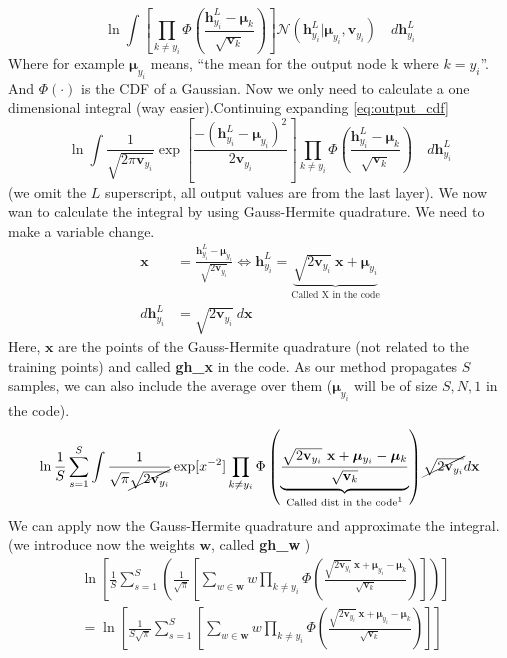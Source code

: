 \documentclass[]{article}
\newcommand{\mbf}[1]{\ensuremath{\mathbf{#1}}}
\begin{document}
\begin{equation}
\label{eq:output_cdf}
\ln \int \left[ \prod_{k\neq y_i} \Phi \left( \frac{\mbf{h}_{y_i}^L - \bm \mu_k}{\sqrt{\mbf{v}_k}} \right) \right] \mathcal{N}(\mbf{h}_{y_i}^L | \bm \mu_{y_i}, \mbf{v}_{y_i} ) \quad d\mbf{h}^L_{y_i}
\end{equation}
Where for example $\bm \mu_{y_i} $ means, ``the mean for the output node k where $k=y_i$''. And $\Phi(\cdot)$ is the CDF of a Gaussian. Now we only need to calculate a one dimensional integral (way easier).Continuing expanding \ref{eq:output_cdf}
\begin{equation}
\ln \int \frac{1}{\sqrt{2 \pi \mbf{v}_{y_i}}} \exp\left[ \frac{-(\mbf{h}_{y_i}^L - \bm \mu_{y_i})^2}{2 \mbf{v}_{y_i} } \right] \prod_{k\neq y_i} \Phi \left( \frac{\mbf{h}_{y_i}^L - \bm \mu_k}{\sqrt{\mbf{v}_k}} \right) \quad d\mbf{h}^L_{y_i}
\end{equation}
(we omit the $L$ superscript, all output values are from the last layer).
We now wan to calculate the integral by using Gauss-Hermite quadrature. We need to make a variable change.
\begin{align}
\mbf{x} &= \frac{\mbf{h}_{y_i}^L - \bm \mu_{y_i}}{\sqrt{2\mbf{v}_{y_i}}} \iff \mbf{h}_{y_i}^L = \underbrace{\sqrt{2\mbf{v}_{y_i}} \ \mbf{x} + \bm \mu_{y_i}}_\text{Called X in the code} \\
d\mbf{h}^L_{y_i} &= \sqrt{2\mbf{v}_{y_i}} \ d\mbf{x}
\end{align}
Here, $ \mbf{x} $ are the points of the Gauss-Hermite quadrature (not related to the training points) and called \textbf{gh\_x}  in the code.
As our method propagates $ S $ samples, we can also include the average over them ($ \bm \mu_{y_i}  $ will be of size $S,N,1$ in the code).
\begin{equation}
\ln \frac{1}{S} \sum_{s=1}^S \int \frac{1}{\sqrt{\pi}\cancel{\sqrt{2  \mbf{v}_{y_i}}}} \exp[x^{-2}] \prod_{k\neq y_i} \Phi \left(\underbrace{ \frac{\sqrt{2\mbf{v}_{y_i}} \ \mbf{x} + \bm \mu_{y_i} - \bm \mu_k}{\sqrt{\mbf{v}_k}}}_\text{Called dist in the code\footnotemark} \right) \cancel{\sqrt{2 \mbf{v}_{y_i}}} d\mbf{x} 
\end{equation}
We can apply now the Gauss-Hermite quadrature and approximate the integral. (we introduce now the weights $\mbf{w}$, called \textbf{gh\_w} )
\begin{align}
&\ln \left[ \frac{1}{S} \sum_{s=1}^S \left( \frac{1}{\sqrt{\pi}}  \left[ \sum_{w \in \mbf{w}} w \prod_{k\neq y_i} \Phi \left( \frac{\sqrt{2\mbf{v}_{y_i}} \ \mbf{x} + \bm \mu_{y_i} - \bm \mu_k}{\sqrt{\mbf{v}_k}}  \right) \right] \right) \right] \nonumber \\
&= \ln \left[ \frac{1}{S\sqrt{\pi}} \sum_{s=1}^S \left[ \sum_{w \in \mbf{w}} w \prod_{k\neq y_i} \Phi \left( \frac{\sqrt{2\mbf{v}_{y_i}} \ \mbf{x} + \bm \mu_{y_i} - \bm \mu_k}{\sqrt{\mbf{v}_k}}  \right) \right]  \right] \nonumber
\end{align}
\end{document}
